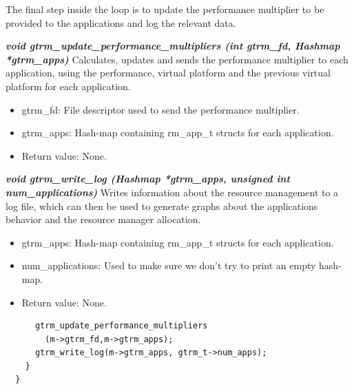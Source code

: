 \documentclass[nobiblatex]{LTHthesis}
\begin{document}
The final step inside the loop is to update the performance multiplier to be
provided to the applications and log the relevant data.
\begin{framed}
	\begin{flushleft}
			\textbf{\emph{{void gtrm\_update\_performance\_multipliers \newline
      (int gtrm\_fd, Hashmap *gtrm\_apps)}}} \newline
			Calculates, updates and sends the performance multiplier to 
      each application, using the performance, virtual platform and 
      the previous virtual platform for each application.
			\begin{itemize} 
			\item gtrm\_fd: File descriptor used to send the performance 
        multiplier.
			\item gtrm\_apps: Hash-map containing rm\_app\_t structs for 
        each application.
			\item Return value: None.
			\end{itemize}
	\end{flushleft}	
\end{framed}

\begin{framed}
	\begin{flushleft}
		\textbf{\emph{{void gtrm\_write\_log \newline
    (Hashmap *gtrm\_apps, unsigned int num\_applications)}}} \newline
		Writes information about the resource management to a log file, 
    which can then be used to generate graphs about the applications
    behavior and the resource manager allocation.
		\begin{itemize} 
		\item gtrm\_apps: Hash-map containing rm\_app\_t structs for 
      each application.
		\item num\_applications: Used to make sure we don't try to print 
      an empty hash-map.
		\item Return value: None.
	  \end{itemize}
  \end{flushleft}	
\end{framed}

\begin{lstlisting}
      gtrm_update_performance_multipliers
        (m->gtrm_fd,m->gtrm_apps);
      gtrm_write_log(m->gtrm_apps, gtrm_t->num_apps);
    }
  }
\end{lstlisting}
\end{document}
